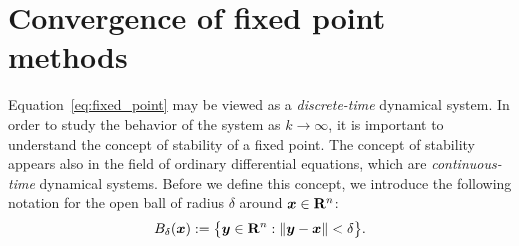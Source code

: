\section{Convergence of fixed point methods}
Equation~\eqref{eq:fixed_point} may be viewed as a \emph{discrete-time} dynamical system.
In order to study the behavior of the system as $k \to \infty$,
it is important to understand the concept of stability of a fixed point.
The concept of stability appears also in the field of ordinary differential equations,
which are \emph{continuous-time} dynamical systems.
Before we define this concept,
we introduce the following notation
for the open ball of radius $\delta$ around $\mathbf{\boldsymbol{x}} \in \mathbf R^n$:
\[
    B_{\delta} (\mathbf{\boldsymbol{x}}) := \bigl\{ \mathbf{\boldsymbol{y}} \in \mathbf R^n : \lVert\mathbf{\boldsymbol{y}} - \mathbf{\boldsymbol{x}}\rVert < \delta \bigr\}.
\]
\vspace{-.7cm}
